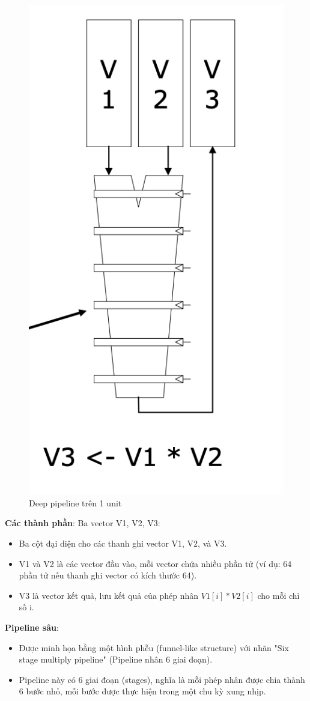 \documentclass[a4paper]{article}
\begin{document}
\begin{multicols}{2}
\begin{figure}[H]
    \centering
    \includegraphics[width=0.7\linewidth]{assets/deep-pipeline.png}
    \caption{Deep pipeline trên 1 unit}
    \label{fig:enter-label}
\end{figure}
\columnbreak
\textbf{Các thành phần}: Ba vector V1, V2, V3:
\begin{itemize}
    \item Ba cột đại diện cho các thanh ghi vector V1, V2, và V3.
    \item V1 và V2 là các vector đầu vào, mỗi vector chứa nhiều phần tử (ví dụ: 64 phần tử nếu thanh ghi vector có kích thước 64).
    \item V3 là vector kết quả, lưu kết quả của phép nhân $V1[i] * V2[i]$ cho mỗi chỉ số i.
\end{itemize}
\textbf{Pipeline sâu}:
\begin{itemize}
    \item Được minh họa bằng một hình phễu (funnel-like structure) với nhãn "Six stage multiply pipeline" (Pipeline nhân 6 giai đoạn).
    \item Pipeline này có 6 giai đoạn (stages), nghĩa là mỗi phép nhân được chia thành 6 bước nhỏ, mỗi bước được thực hiện trong một chu kỳ xung nhịp.
\end{itemize}
\end{multicols}
\end{document}
